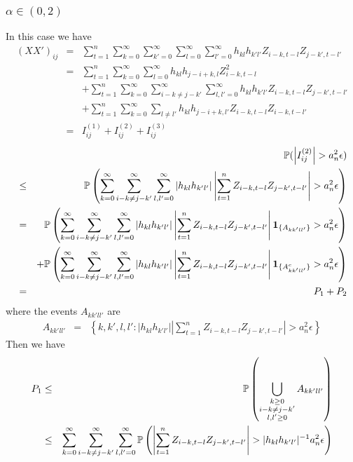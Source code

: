 \documentclass{article}
\begin{document}
\subsubsection[alpha in (0,2)]{$\alpha \in (0,2)$}
In this case we have
\begin{eqnarray*}
  (XX')_{ij} &=& \sum_{t=1}^n \sum_{k=0}^\infty \sum_{k'=0}^\infty
  \sum_{l=0}^\infty \sum_{l'=0}^\infty h_{kl} h_{k'l'} Z_{i-k,t-l}
  Z_{j-k',t-l'} \\
  &=& \sum_{t=1}^n \sum_{k=0}^\infty \sum_{l=0}^\infty h_{kl}
  h_{j-i+k,l} Z_{i-k, t-l}^2 \\
  && + \sum_{t=1}^n \sum_{k=0}^\infty \sum_{i-k \neq j-k'}^\infty
  \sum_{l,l'=0}^\infty h_{kl} h_{k'l'} Z_{i-k,t-l} Z_{j-k',t-l'} \\
  && + \sum_{t=1}^n \sum_{k=0}^\infty \sum_{l\neq l'} h_{kl}
  h_{j-i+k, l'} Z_{i-k,t-l} Z_{i-k,t-l'} \\
  &=& I^{(1)}_{ij} + I^{(2)}_{ij} + I^{(3)}_{ij}
\end{eqnarray*}
\begin{eqnarray*}
  && \mathbb{P}(\left| I^{(2)}_{ij} \right| > a_n^2 \epsilon) \\
  &\leq& \mathbb{P}\left(
    \sum_{k=0}^\infty \sum_{i-k \neq j-k'}^\infty
    \sum_{l,l'=0}^\infty | h_{kl} h_{k'l'}| \left|
      \sum_{t=1}^n  Z_{i-k,t-l} Z_{j-k',t-l'} \right| > a_n^2 \epsilon
  \right) \\
  &=& \mathbb{P}\left(
    \sum_{k=0}^\infty \sum_{i-k \neq j-k'}^\infty
    \sum_{l,l'=0}^\infty | h_{kl} h_{k'l'}| \left|
      \sum_{t=1}^n  Z_{i-k,t-l} Z_{j-k',t-l'} \right|
    \mathbf{1}_{\{A_{kk'll'}\}} > a_n^2 \epsilon
  \right) \\
  && + \mathbb{P}\left(
    \sum_{k=0}^\infty \sum_{i-k \neq j-k'}^\infty
    \sum_{l,l'=0}^\infty | h_{kl} h_{k'l'}| \left|
      \sum_{t=1}^n  Z_{i-k,t-l} Z_{j-k',t-l'} \right|
    \mathbf{1}_{\{A^c_{kk'll'}\}} > a_n^2 \epsilon
  \right) \\
  &=& P_1 + P_2
\end{eqnarray*}
where the events $A_{kk'll'}$ are
\begin{eqnarray*}
  A_{kk'll'} &=& \left\{
  k,k',l,l': | h_{kl} h_{k'l'}| \left| \sum_{t=1}^n  Z_{i-k,t-l} Z_{j-k',t-l'}
  \right| > a_n^2 \epsilon
  \right\}
\end{eqnarray*}
Then we have
\begin{eqnarray*}
  P_1 &\leq& \mathbb{P}\left(
    \bigcup_{\substack{k \geq 0 \\ i-k \neq j-k' \\ l,l'\geq0}}
    A_{kk'll'}
  \right) \\
  &\leq& \sum_{k=0}^\infty \sum_{i-k \neq j-k'}^\infty
  \sum_{l,l'=0}^\infty \mathbb{P}\left(
    \left| \sum_{t=1}^n  Z_{i-k,t-l} Z_{j-k',t-l'}
    \right| > | h_{kl} h_{k'l'}|^{-1} a_n^2 \epsilon 
  \right)
\end{eqnarray*}
\end{document}
